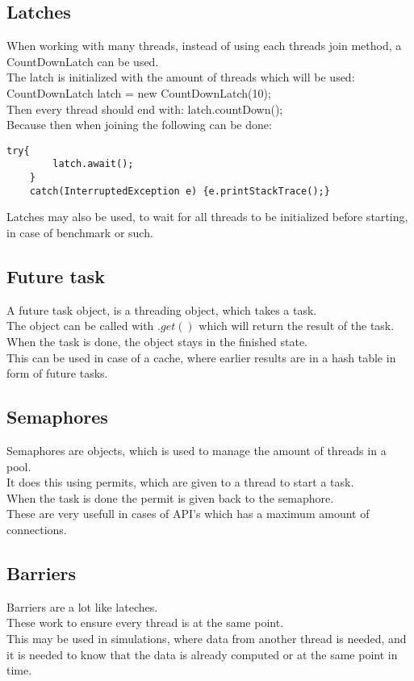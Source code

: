 \documentclass[12pt, a4paper]{article}
\begin{document}
		\subsection{Latches}
			When working with many threads, instead of using each threads join method, a CountDownLatch can be used.\\
			The latch is initialized with the amount of threads which will be used: CountDownLatch latch = new CountDownLatch(10);\\
			Then every thread should end with: latch.countDown();\\
			Because then when joining the following can be done:
\begin{lstlisting}[Language = Java, frame = trBL, firstnumber = 0]
	try{
		latch.await();
	}
	catch(InterruptedException e) {e.printStackTrace();}
\end{lstlisting}
			Latches may also be used, to wait for all threads to be initialized before starting, in case of benchmark or such.\\
		\subsection{Future task}
			A future task object, is a threading object, which takes a task.\\
			The object can be called with $.get()$ which will return the result of the task.\\
			When the task is done, the object stays in the finished state.\\
			This can be used in case of a cache, where earlier results are in a hash table in form of future tasks.
		\subsection{Semaphores}
			Semaphores are objects, which is used to manage the amount of threads in a pool.\\
			It does this using permits, which are given to a thread to start a task.\\
			When the task is done the permit is given back to the semaphore.\\
			These are very usefull in cases of API's which has a maximum amount of connections.
		\subsection{Barriers}
			Barriers are a lot like lateches.\\
			These work to ensure every thread is at the same point.\\
			This may be used in simulations, where data from another thread is needed, and it is needed to know that the data is already computed or at the same point in time.
\end{document}
